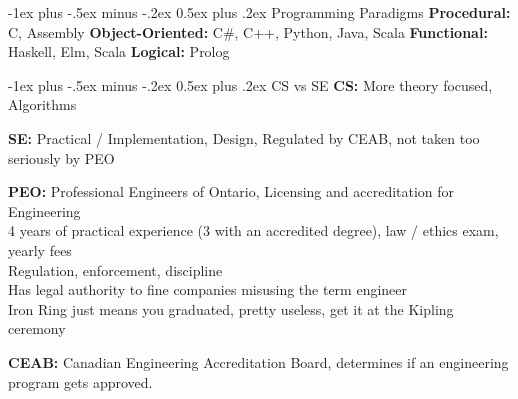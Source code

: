 \documentclass[letterpaper, 8pt]{extarticle}
\makeatletter
\renewcommand{\section}{\@startsection{section}{1}{0mm}%
                                {-1ex plus -.5ex minus -.2ex}%
                                {0.5ex plus .2ex}%
                                {\normalfont\normalsize\bfseries}}
\makeatother
\begin{document}
\raggedright
\tiny


\setlength{\premulticols}{1pt}
\setlength{\postmulticols}{1pt}
\setlength{\multicolsep}{1pt}
\setlength{\columnsep}{2pt}
\begin{multicols*}{5}


  \section{Programming Paradigms}
  \textbf{Procedural:} C, Assembly
  \textbf{Object-Oriented:} C\#, C++, Python, Java, Scala
  \textbf{Functional:} Haskell, Elm, Scala
  \textbf{Logical:} Prolog

  \section{CS vs SE}
  \textbf{CS:} More theory focused, Algorithms

  \textbf{SE:} Practical / Implementation, Design,
  Regulated by CEAB, not taken too seriously by PEO

  \textbf{PEO:} Professional Engineers of Ontario, Licensing and accreditation for Engineering \\
  4 years of practical experience (3 with an accredited degree), law / ethics exam, yearly fees \\
  Regulation, enforcement, discipline \\
  Has legal authority to fine companies misusing the term engineer \\
  Iron Ring just means you graduated, pretty useless, get it at the Kipling ceremony

  \textbf{CEAB:} Canadian Engineering Accreditation Board,
  determines if an engineering program gets approved.


\end{multicols*}
\end{document}
